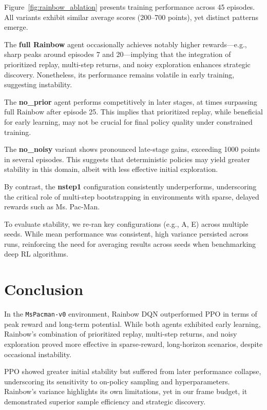 \documentclass{article}
\begin{document}
Figure~\ref{fig:rainbow_ablation} presents training performance across 45 episodes. All variants exhibit similar average scores (200–700 points), yet distinct patterns emerge.

The \textbf{full Rainbow} agent occasionally achieves notably higher rewards—e.g., sharp peaks around episodes 7 and 20—implying that the integration of prioritized replay, multi-step returns, and noisy exploration enhances strategic discovery. Nonetheless, its performance remains volatile in early training, suggesting instability.

The \textbf{no\_prior} agent performs competitively in later stages, at times surpassing full Rainbow after episode 25. This implies that prioritized replay, while beneficial for early learning, may not be crucial for final policy quality under constrained training.

The \textbf{no\_noisy} variant shows pronounced late-stage gains, exceeding 1000 points in several episodes. This suggests that deterministic policies may yield greater stability in this domain, albeit with less effective initial exploration.

By contrast, the \textbf{nstep1} configuration consistently underperforms, underscoring the critical role of multi-step bootstrapping in environments with sparse, delayed rewards such as Ms. Pac-Man.

To evaluate stability, we re-ran key configurations (e.g., A, E) across multiple seeds. While mean performance was consistent, high variance persisted across runs, reinforcing the need for averaging results across seeds when benchmarking deep RL algorithms.

\section{Conclusion}

In the \texttt{MsPacman-v0} environment, Rainbow DQN outperformed PPO in terms of peak reward and long-term potential. While both agents exhibited early learning, Rainbow’s combination of prioritized replay, multi-step returns, and noisy exploration proved more effective in sparse-reward, long-horizon scenarios, despite occasional instability.

PPO showed greater initial stability but suffered from later performance collapse, underscoring its sensitivity to on-policy sampling and hyperparameters. Rainbow's variance highlights its own limitations, yet in our frame budget, it demonstrated superior sample efficiency and strategic discovery.
\end{document}
